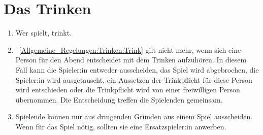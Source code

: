 \section{Das Trinken}
\begin{enumerate}[label={(\arabic*)}]
	\item\label{Allgemeine_Regelungen:Trinken:Trink}
	Wer spielt, trinkt.
	
	\item
~\ref{Allgemeine_Regelungen:Trinken:Trink} gilt nicht mehr, wenn sich eine Person für den Abend entscheidet mit dem Trinken aufzuhören.
	In diesem Fall kann die Spieler:in entweder ausscheiden, das Spiel wird abgebrochen, die Spieler:in wird ausgetauscht,
	ein Aussetzen der Trinkpflicht für diese Person wird entschieden oder die Trinkpflicht wird von einer freiwilligen Person übernommen.
	Die Entscheidung treffen die Spielenden gemeinsam.
	
	\item
	Spielende können nur aus dringenden Gründen aus einem Spiel ausscheiden.
	Wenn für das Spiel nötig, sollten sie eine Ersatzspieler:in anwerben.
\end{enumerate}

